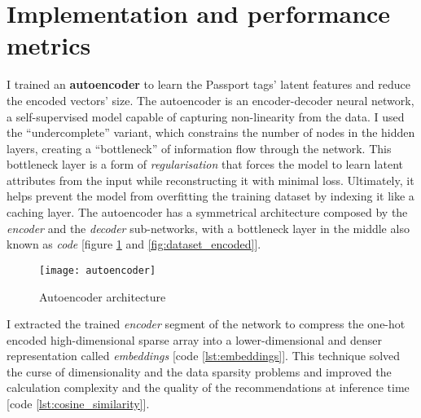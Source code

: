 
\section{Implementation and performance metrics}

I trained an \textbf{autoencoder} \cite{DBLP:journals/corr/abs-2003-05991,DBLP:journals/corr/abs-2201-03898}
to learn the Passport tags' latent features and reduce the encoded vectors' size.
The autoencoder is an encoder-decoder neural network, a self-supervised model capable of capturing non-linearity from the data.
I used the ``undercomplete'' variant, which constrains the number of nodes in the hidden layers, creating a ``bottleneck''
of information flow through the network.
This bottleneck layer is a form of \textit{regularisation} that forces the model to learn latent attributes from the input
while reconstructing it with minimal loss. Ultimately, it helps prevent the model from overfitting the training dataset by indexing it like a caching layer.
The autoencoder has a symmetrical architecture composed by the \textit{encoder} and the \textit{decoder} sub-networks,
with a bottleneck layer in the middle also known as \textit{code} [figure \ref{fig:autoencoder} and \ref{fig:dataset_encoded}].

\begin{figure}[H]
  \centering
  \texttt{[image: autoencoder]}
  \caption{Autoencoder architecture}
  \label{fig:autoencoder}
\end{figure}

I extracted the trained \textit{encoder} segment of the network to compress the one-hot encoded high-dimensional sparse array into
a lower-dimensional and denser representation called \textit{embeddings} \cite{GoogleForDevelopers:Embeddings} [code \ref{lst:embeddings}].
This technique solved the curse of dimensionality and the data sparsity problems and improved the calculation
complexity and the quality of the recommendations at inference time [code \ref{lst:cosine_similarity}].

